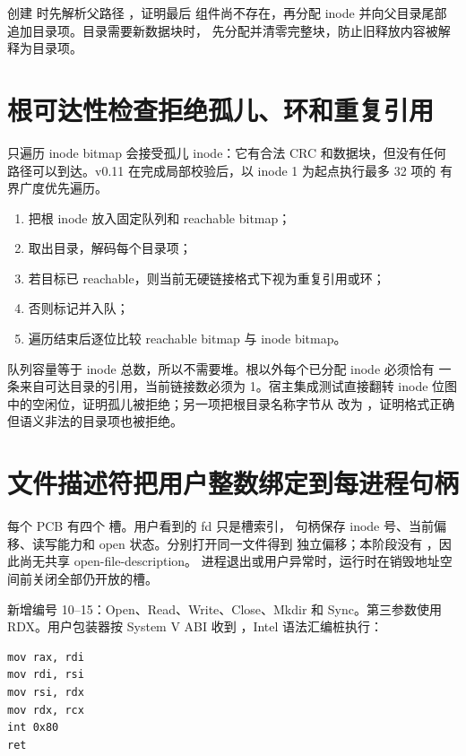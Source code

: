 创建  时先解析父路径 ，证明最后
组件尚不存在，再分配 inode 并向父目录尾部追加目录项。目录需要新数据块时，
先分配并清零完整块，防止旧释放内容被解释为目录项。

\section{根可达性检查拒绝孤儿、环和重复引用}

只遍历 inode bitmap 会接受孤儿 inode：它有合法 CRC 和数据块，但没有任何
路径可以到达。v0.11 在完成局部校验后，以 inode 1 为起点执行最多 32 项的
有界广度优先遍历。

\begin{enumerate}[label=\arabic*.]
  \item 把根 inode 放入固定队列和 reachable bitmap；
  \item 取出目录，解码每个目录项；
  \item 若目标已 reachable，则当前无硬链接格式下视为重复引用或环；
  \item 否则标记并入队；
  \item 遍历结束后逐位比较 reachable bitmap 与 inode bitmap。
\end{enumerate}

队列容量等于 inode 总数，所以不需要堆。根以外每个已分配 inode 必须恰有
一条来自可达目录的引用，当前链接数必须为 1。宿主集成测试直接翻转 inode
位图中的空闲位，证明孤儿被拒绝；另一项把根目录名称字节从  改为
，证明格式正确但语义非法的目录项也被拒绝。

\section{文件描述符把用户整数绑定到每进程句柄}

每个 PCB 有四个  槽。用户看到的 fd 只是槽索引，
句柄保存 inode 号、当前偏移、读写能力和 open 状态。分别打开同一文件得到
独立偏移；本阶段没有 ，因此尚无共享 open-file-description。
进程退出或用户异常时，运行时在销毁地址空间前关闭全部仍开放的槽。

 新增编号 10--15：Open、Read、Write、Close、Mkdir 和
Sync。第三参数使用 RDX。用户包装器按 System V ABI 收到
，Intel 语法汇编桩执行：

\begin{lstlisting}[language={[x86masm]Assembler}]
mov rax, rdi
mov rdi, rsi
mov rsi, rdx
mov rdx, rcx
int 0x80
ret
\end{lstlisting}

